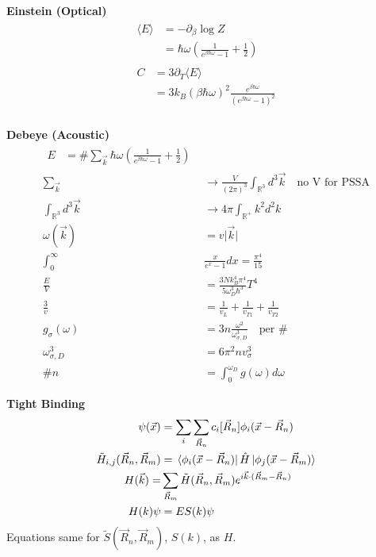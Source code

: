 \documentclass[12pt]{article}
\begin{document}
\begin{multicols}{2}
\noindent
\textbf{Einstein (Optical)}
\begin{align}
  \begin{split}
    \langle E \rangle &= -\partial_\beta \log Z\\
    &= \hbar \omega(\frac{1}{e^{\beta\hbar\omega} - 1} + \frac{1}{2})
  \end{split}\\
  \begin{split}
    C &= 3 \partial_T \langle E \rangle\\
    &= 3 k_B(\beta \hbar \omega)^2 \frac{e^{\beta\hbar\omega}}{(e^{\beta\hbar\omega} - 1)^2}
  \end{split}\\
\end{align}

\noindent
\textbf{Debeye (Acoustic)}
\begin{align}
  \begin{split}
    E &= \# \sum_{\vec{k}}\hbar\omega (\frac{1}{e^{\beta\hbar\omega} - 1} + \frac{1}{2})
  \end{split}\\
  \sum_{\vec{k}} &\rightarrow \frac{V}{(2\pi)^3} \int_{\mathbb{R}^3} d^3\vec{k} \quad \textrm{no V for PSSA}\\
  \int_{\mathbb{R}^3} d^3\vec{k} &\rightarrow 4\pi \int_{\mathbb{R}^+}k^2d^2k\\
  \omega(\vec{k}) &= v\lvert\vec{k}\rvert\\
  \int_0^{\infty}&\frac{x}{e^x - 1}dx = \frac{\pi^4}{15}\\
  \frac{E}{V} &= \frac{3Nk_B^4\pi^4}{5\omega_D^3\hbar^3}T^4\\
  \frac{3}{v} &= \frac{1}{v_L} + \frac{1}{v_{T1}} + \frac{1}{v_{T2}}\\
  g_{\sigma}(\omega) &= 3 n \frac{\omega^2}{\omega_{\sigma,D}^3} \quad \textrm{per \#}\\
  \omega_{\sigma,D}^3 &= 6\pi^2nv_{\sigma}^3\\
  \# n &= \int_0^{\omega_D} g(\omega)d\omega
\end{align}

\noindent
\textbf{Tight Binding}
\begin{align}
  \psi(\vec{x}) &= \sum_i \sum_{\vec{R}_n} c_{i}[\vec{R}_n] \phi_{i}(\vec{x} - \vec{R}_n)\\ %
  \tilde{H}_{i,j}(\vec{R}_n, \vec{R}_m) &= \bra*{\phi_{i}(\vec{x} - \vec{R}_{n})} \hat{H} \ket*{\phi_{j}(\vec{x} - \vec{R}_{m})}\\ %
  H(\vec{k}) = &\sum_{\vec{R}_{m}} \tilde{H}(\vec{R}_{n}, \vec{R}_{m}) e^{i\vec{k} \cdot (\vec{R}_{m} - \vec{R}_{n})}\\ %
  H(k)\psi &= E S(k)\psi
\end{align}
Equations same for $\tilde{S}(\vec{R}_n, \vec{R}_m)$, $S(k)$, as $H$.


\end{multicols}
\end{document}
